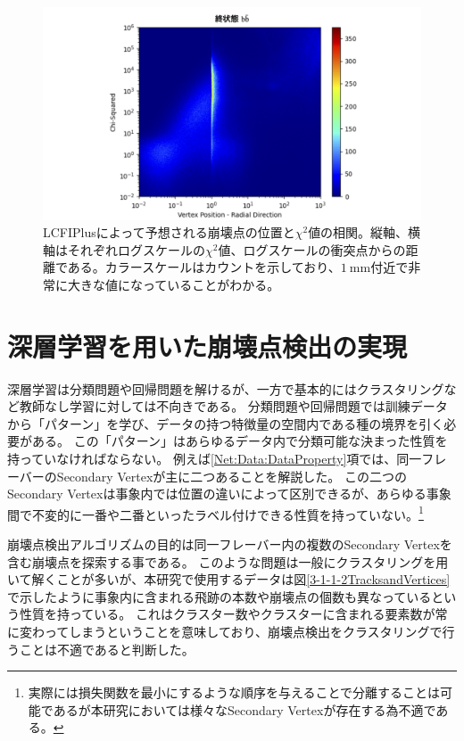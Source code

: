 \begin{figure}[htbp]
 \centering
 \includegraphics[width=1.0\textwidth, clip]{Figure/3Networks/3-1-2-4VertexPositionsvsChiSquare.png}
 \caption[LCFIPlusによって予想される崩壊点の位置と$\chi^2$値の相関]{LCFIPlusによって予想される崩壊点の位置と$\chi^2$値の相関。縦軸、横軸はそれぞれログスケールの$\chi^2$値、ログスケールの衝突点からの距離である。カラースケールはカウントを示しており、$1\ \mathrm{mm}$付近で非常に大きな値になっていることがわかる。}
 \label{3-1-2-4VertexPositionsvsChiSquare}
\end{figure}

\newpage
\section{深層学習を用いた崩壊点検出の実現} \label{Net:forVertexFinderwithDL}

深層学習は分類問題や回帰問題を解けるが、一方で基本的にはクラスタリングなど教師なし学習に対しては不向きである。
分類問題や回帰問題では訓練データから「パターン」を学び、データの持つ特徴量の空間内である種の境界を引く必要がある。
この「パターン」はあらゆるデータ内で分類可能な決まった性質を持っていなければならない。
例えば\ref{Net:Data:DataProperty}項では、同一フレーバーのSecondary Vertexが主に二つあることを解説した。
この二つのSecondary Vertexは事象内では位置の違いによって区別できるが、あらゆる事象間で不変的に一番や二番といったラベル付けできる性質を持っていない。\footnote{実際には損失関数を最小にするような順序を与えることで分離することは可能であるが本研究においては様々なSecondary Vertexが存在する為不適である。}

崩壊点検出アルゴリズムの目的は同一フレーバー内の複数のSecondary Vertexを含む崩壊点を探索する事である。
このような問題は一般にクラスタリングを用いて解くことが多いが、本研究で使用するデータは図\ref{3-1-1-2TracksandVertices}で示したように事象内に含まれる飛跡の本数や崩壊点の個数も異なっているという性質を持っている。
これはクラスター数やクラスターに含まれる要素数が常に変わってしまうということを意味しており、崩壊点検出をクラスタリングで行うことは不適であると判断した。

